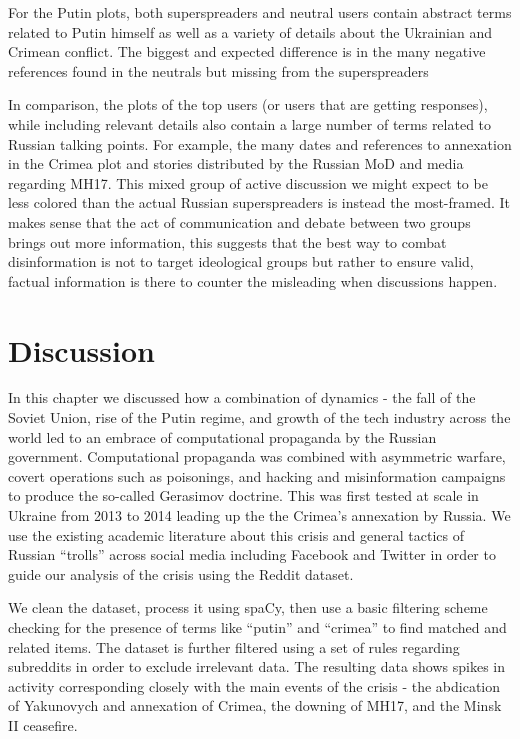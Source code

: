 For the Putin plots, both superspreaders and neutral users contain abstract terms related to Putin himself as well as a variety of details about the Ukrainian and Crimean conflict.
The biggest and expected difference is in the many negative references found in the neutrals but missing from the superspreaders

In comparison, the plots of the top users (or users that are getting responses), while including relevant details also contain a large number of terms related to Russian talking points.
For example, the many dates and references to annexation in the Crimea plot and stories distributed by the Russian MoD and media regarding MH17.
This mixed group of active discussion we might expect to be less colored than the actual Russian superspreaders is instead the most-framed.
It makes sense that the act of communication and debate between two groups brings out more information, this suggests that the best way to combat disinformation is not to target ideological groups but rather to ensure valid, factual information is there to counter the misleading when discussions happen.

\section{Discussion}

In this chapter we discussed how a combination of dynamics - the fall of the Soviet Union, rise of the Putin regime, and growth of the tech industry across the world led to an embrace of computational propaganda by the Russian government.
Computational propaganda was combined with asymmetric warfare, covert operations such as poisonings, and hacking and misinformation campaigns to produce the so-called Gerasimov doctrine.
This was first tested at scale in Ukraine from 2013 to 2014 leading up the the Crimea's annexation by Russia.
We use the existing academic literature about this crisis and general tactics of Russian ``trolls'' across social media including Facebook and Twitter in order to guide our analysis of the crisis using the Reddit dataset.

We clean the dataset, process it using spaCy, then use a basic filtering scheme checking for the presence of terms like ``putin'' and ``crimea'' to find matched and related items.
The dataset is further filtered using a set of rules regarding subreddits in order to exclude irrelevant data.
The resulting data shows spikes in activity corresponding closely with the main events of the crisis - the abdication of Yakunovych and annexation of Crimea, the downing of MH17, and the Minsk II ceasefire.

